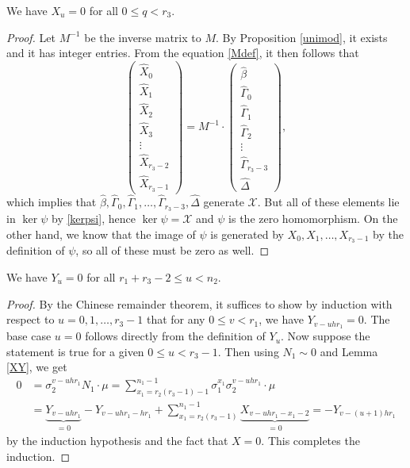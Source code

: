 \begin{cor}
We have $X_u=0$ for all $0\leq q <r_3$.
\end{cor}
\begin{proof}
Let $M^{-1}$ be the inverse matrix to $M$. By Proposition \ref{unimod}, it exists and it has integer entries. From the equation \eqref{Mdef}, it then follows that
\begin{equation*}
\begin{pmatrix}
\widehat{X}_0\\ 
\widehat{X}_1 \\
\widehat{X}_2 \\ 
\widehat{X}_3 \\ 
\vdots\\ 
\widehat{X}_{r_3-2}\\
\widehat{X}_{r_3-1}
\end{pmatrix}
=
M^{-1}\cdot
\begin{pmatrix}
\widehat{\beta}\\ 
\widehat{\Gamma}_0\\ 
\widehat{\Gamma}_1\\ 
\widehat{\Gamma}_2 \\ 
\vdots\\ 
\widehat{\Gamma}_{r_3-3} \\ 
\widehat{\Delta}
\end{pmatrix},
\end{equation*}
which implies that $\widehat{\beta},\widehat{\Gamma}_0,\widehat{\Gamma}_1,\dots,\widehat{\Gamma}_{r_3-3}, \widehat{\Delta}$ generate $\mathcal{X}$. But all of these elements lie in $\ker \psi$ by \eqref{kerpsi}, hence $\ker \psi = \mathcal{X}$ and $\psi$ is the zero homomorphism. On the other hand, we know that the image of $\psi$ is generated by $X_0,X_1,\dots,X_{r_3-1}$ by the definition of $\psi$, so all of these must be zero as well.
\end{proof}

\begin{cor}
We have $Y_u=0$ for all $r_1+r_3-2\leq u < n_2$.
\end{cor}
\begin{proof}
By the Chinese remainder theorem, it suffices to show by induction with respect to $u=0,1,\dots,r_3-1$ that for any $0\leq v<r_1$, we have $Y_{v-uhr_1}=0.$ The base case $u=0$ follows directly from the definition of $Y_u$. Now suppose the statement is true for a given $0\leq u<r_3-1$. Then using $N_1\sim 0$ and Lemma \ref{XY}, we get
\begin{align*}
0&=\sigma_2^{v-uhr_1} N_1 \cdot \mu=\sum_{x_1=r_2(r_3-1)-1}^{n_1-1}\sigma_1^{x_1}\sigma_2^{v-uhr_1}\cdot\mu\\
&=\underbrace{Y_{v-uhr_1}}_{=0}-Y_{v-uhr_1-hr_1}+\sum_{x_1=r_2(r_3-1)}^{n_1-1}\underbrace {X_{v-uhr_1-x_1-2}}_{=0}=-Y_{v-(u+1)hr_1}
\end{align*}
by the induction hypothesis and the fact that $X=0$. This completes the induction.
\end{proof}

